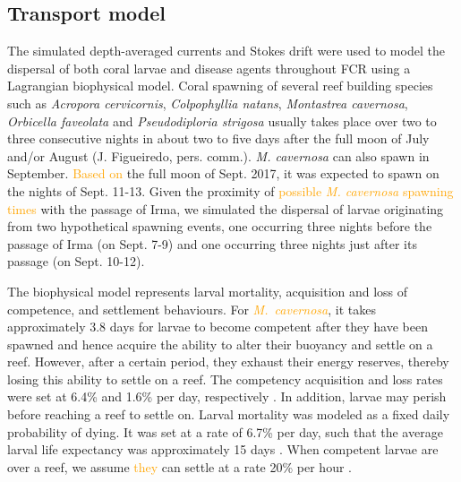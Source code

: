 \documentclass[fleqn,10pt]{wlscirep}
\newcommand{\modif}[1]{\textcolor{orange}{#1}}
\begin{document}
\subsection{Transport model}
The simulated depth-averaged currents and Stokes drift were used to model the dispersal of both coral larvae and disease agents throughout FCR using a Lagrangian biophysical model. Coral spawning of several reef building species such as {\it Acropora cervicornis}, {\it Colpophyllia natans}, {\it Montastrea cavernosa}, {\it Orbicella faveolata} and {\it Pseudodiploria strigosa} usually takes place over two to three consecutive nights in about two to five days after the full moon of July and/or August (J. Figueiredo, pers. comm.). {\it M. cavernosa} can also spawn in September. \modif{Based on} the full moon of Sept. 2017, it was expected to spawn on the nights of Sept. 11-13. Given the proximity of \modif{possible \textit{M. cavernosa} spawning times} with the passage of Irma, we simulated the dispersal of larvae originating from two hypothetical spawning events, one occurring three nights before the passage of Irma (on Sept. 7-9) and one occurring three nights just after its passage (on Sept. 10-12).

The biophysical model represents larval mortality, acquisition and loss of competence, and settlement behaviours. For \modif{\it M.~cavernosa}, it takes approximately 3.8 days for larvae to become competent after they have been spawned and hence acquire the ability to alter their buoyancy and settle on a reef. However, after a certain period, they exhaust their energy reserves, thereby losing this ability to settle on a reef. The competency acquisition and loss rates were set at 6.4\% and 1.6\% per day, respectively \citep{Kuba2016}. In addition, larvae may perish before reaching a reef to settle on. Larval mortality was modeled as a fixed daily probability of dying. It was set at a rate of 6.7\% per day, such that the average larval life expectancy was approximately 15 days \citep{Kuba2016}. When competent larvae are over a reef, we assume \modif{they} can settle at a rate 20\% per hour \citep{king2023larval}.
\end{document}

